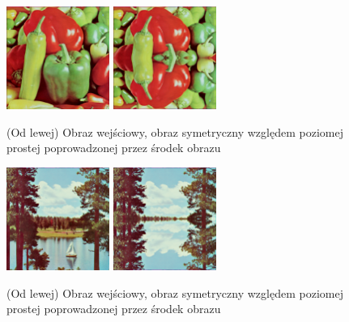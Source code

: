 \documentclass[final,a4paper,openany,12pt]{mwbk}
\begin{document}
\begin{figure}[H]
	\begin{center}
		\includegraphics[width=0.3\textwidth]{1/1Geo_py_Original}
		\includegraphics[width=0.3\textwidth]{1/1Geo_py_Result}
	\end{center}
	\caption{(Od lewej) Obraz wejściowy, obraz symetryczny względem poziomej prostej poprowadzonej przez środek obrazu }
\end{figure}

\begin{figure}[H]
	\begin{center}
		\includegraphics[width=0.3\textwidth]{2/2Geo_py_Original}
		\includegraphics[width=0.3\textwidth]{2/2Geo_py_Result}
	\end{center}
	\caption{(Od lewej) Obraz wejściowy, obraz symetryczny względem poziomej prostej poprowadzonej przez środek obrazu }
\end{figure}
\end{document}
